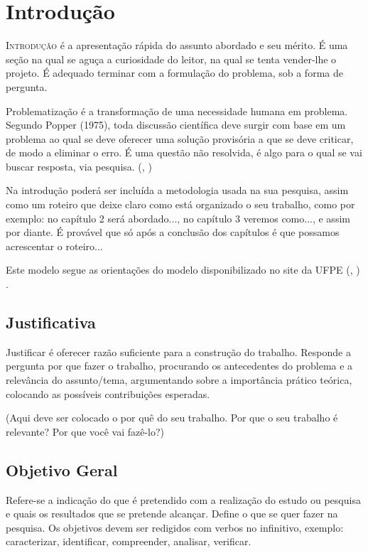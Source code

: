 \chapter{Introdução}
\label{cap:um}

\lettrine[loversize=0.25,findent=0.2em,nindent=0em]{I}{ntrodução}  é a apresentação rápida do assunto abordado e seu mérito. É uma seção na qual se aguça a curiosidade do leitor, na qual se tenta vender-lhe o projeto. É adequado terminar com a formulação do problema, sob a forma de pergunta.

Problematização é a transformação de uma necessidade humana em problema. Segundo Popper (1975), toda discussão científica deve surgir com base em um problema ao qual se deve oferecer uma solução provisória a que se deve criticar, de modo a eliminar o erro. É uma questão não resolvida, é algo para o qual se vai buscar resposta, via pesquisa. %
(\citeauthor{lakatos2001trabalho}, \citeyear{lakatos2001trabalho})

Na introdução poderá ser incluída a metodologia usada na sua pesquisa, assim como um roteiro que deixe claro como está organizado o seu trabalho, como por exemplo: no capítulo 2 será abordado..., no capítulo 3 veremos como..., e assim por diante. É provável que só após a conclusão dos capítulos é que possamos acrescentar o roteiro...

Este modelo segue as orientações do modelo disponibilizado no site da UFPE (\citeauthor{Modelo_TCC}, \citeyear{Modelo_TCC}) . 


\section{Justificativa}\label{Motivação}
Justificar é oferecer razão suficiente para a construção do trabalho. Responde a pergunta por que fazer o trabalho, procurando os antecedentes do problema e a relevância do assunto/tema, argumentando sobre a importância prático teórica, colocando as possíveis contribuições esperadas.

(Aqui deve ser colocado o por quê do seu trabalho. Por que o seu trabalho é relevante? Por que você vai fazê-lo?)


\section{Objetivo Geral}\label{Objetivos}

Refere-se a indicação do que é pretendido com a realização do estudo ou pesquisa e quais os resultados que se pretende alcançar. Define o que se quer fazer na pesquisa. Os objetivos devem ser redigidos com verbos no infinitivo, exemplo: caracterizar, identificar, compreender, analisar, verificar.

